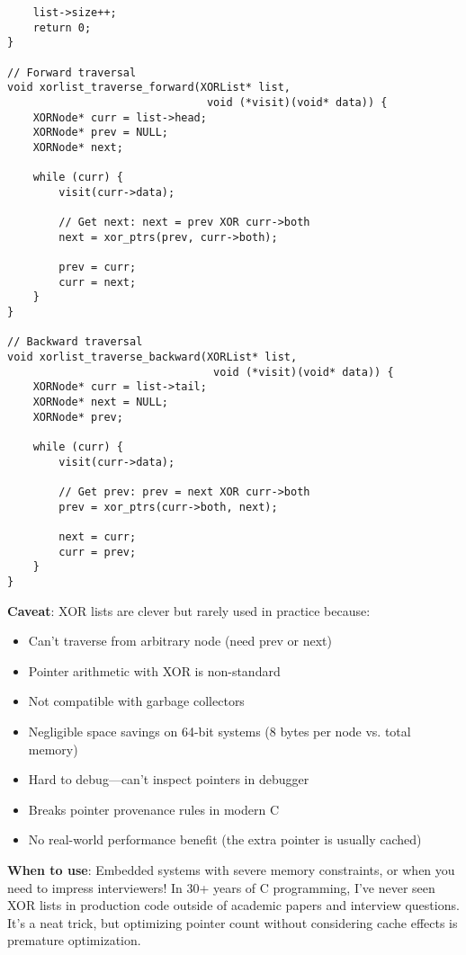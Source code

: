 \begin{lstlisting}
    list->size++;
    return 0;
}

// Forward traversal
void xorlist_traverse_forward(XORList* list,
                               void (*visit)(void* data)) {
    XORNode* curr = list->head;
    XORNode* prev = NULL;
    XORNode* next;

    while (curr) {
        visit(curr->data);

        // Get next: next = prev XOR curr->both
        next = xor_ptrs(prev, curr->both);

        prev = curr;
        curr = next;
    }
}

// Backward traversal
void xorlist_traverse_backward(XORList* list,
                                void (*visit)(void* data)) {
    XORNode* curr = list->tail;
    XORNode* next = NULL;
    XORNode* prev;

    while (curr) {
        visit(curr->data);

        // Get prev: prev = next XOR curr->both
        prev = xor_ptrs(curr->both, next);

        next = curr;
        curr = prev;
    }
}
\end{lstlisting}

\textbf{Caveat}: XOR lists are clever but rarely used in practice because:

\begin{itemize}
    \item Can't traverse from arbitrary node (need prev or next)
    \item Pointer arithmetic with XOR is non-standard
    \item Not compatible with garbage collectors
    \item Negligible space savings on 64-bit systems (8 bytes per node vs. total memory)
    \item Hard to debug---can't inspect pointers in debugger
    \item Breaks pointer provenance rules in modern C
    \item No real-world performance benefit (the extra pointer is usually cached)
\end{itemize}

\textbf{When to use}: Embedded systems with severe memory constraints, or when you need to impress interviewers! In 30+ years of C programming, I've never seen XOR lists in production code outside of academic papers and interview questions. It's a neat trick, but optimizing pointer count without considering cache effects is premature optimization.

